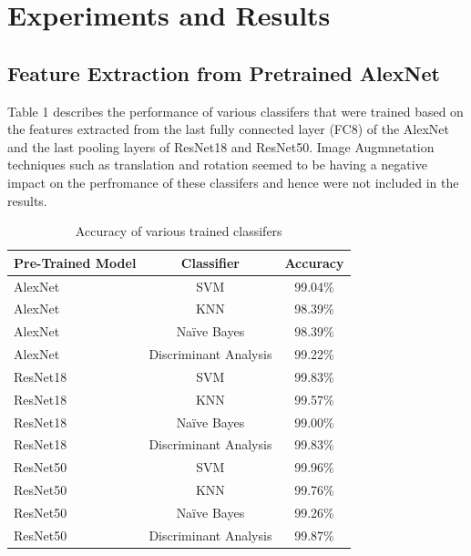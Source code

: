 \documentclass[doc/report.tex]{subfiles}
\begin{document}
\section{Experiments and Results}

\subsection{Feature Extraction from Pretrained AlexNet}
Table 1 describes the performance of various classifers that were trained based
on the features extracted from the last fully connected layer (FC8) of the
AlexNet and the last pooling layers of ResNet18 and ResNet50. Image
Augmnetation techniques such as translation and rotation seemed to be having a
negative impact on the perfromance of these classifers and hence were not
included in the results.

\begin{table}[h]
\centering
\caption{Accuracy of various trained classifers}
\label{tab:my-table1}
\begin{tabular}{|l|c|c|}
\hline
\multicolumn{1}{|c|}{Pre-Trained Model} & Classifier                                 & Accuracy \\ \hline
AlexNet                                 & SVM                                        & 99.04\%  \\ \hline
AlexNet                                 & KNN                                        & 98.39\%  \\ \hline
AlexNet                                 & Naïve Bayes                                & 98.39\%  \\ \hline
AlexNet                                 & Discriminant Analysis                      & 99.22\%  \\ \hline
ResNet18                                & SVM                                        & 99.83\%  \\ \hline
ResNet18                                & KNN                                        & 99.57\%  \\ \hline
ResNet18                                & Naïve Bayes                                & 99.00\%  \\ \hline
ResNet18                                & Discriminant Analysis                      & 99.83\%  \\ \hline
ResNet50                                & SVM                                        & 99.96\%  \\ \hline
ResNet50                                & KNN                                        & 99.76\%  \\ \hline
ResNet50                                & Naïve Bayes                                & 99.26\%  \\ \hline
ResNet50                                & \multicolumn{1}{l|}{Discriminant Analysis} & 99.87\%  \\ \hline
\end{tabular}%
\end{table}
\end{document}
